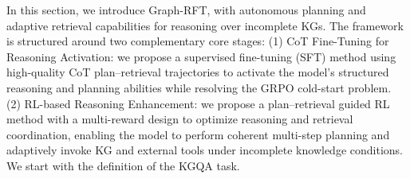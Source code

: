 \documentclass[sigconf]{acmart}
\begin{document}
In this section, we introduce Graph-RFT, with autonomous planning and adaptive retrieval capabilities for reasoning over incomplete KGs.
The framework is structured around two complementary core stages: (1) CoT Fine-Tuning for Reasoning Activation: 
we propose a supervised fine-tuning (SFT) method using high-quality CoT plan–retrieval trajectories to activate the model’s structured reasoning and planning abilities while resolving the GRPO cold-start problem. 
(2) RL-based Reasoning Enhancement: we propose a plan–retrieval guided RL method with a multi-reward design to optimize reasoning and retrieval coordination, enabling the model to perform coherent multi-step planning and adaptively invoke KG and external tools under incomplete knowledge conditions.
We start with the definition of the KGQA task.
\end{document}
